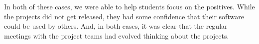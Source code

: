 In both of these cases, we were able to help students focus on the
positives.  While the projects did not get released, they had some
confidence that their software could be used by others.  And, in
both cases, it was clear that the regular meetings with the project
teams had evolved thinking about the projects.

